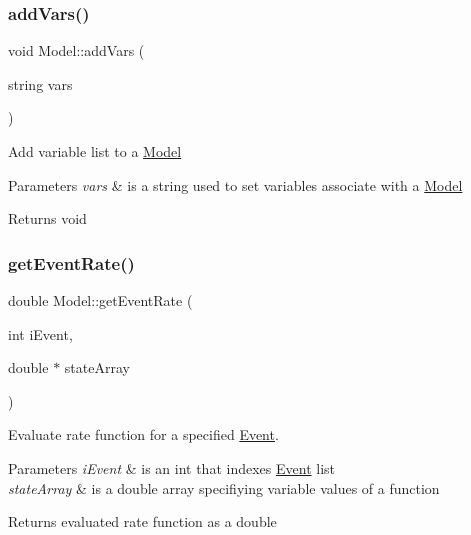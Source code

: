 \subsubsection{\texorpdfstring{add\+Vars()}{addVars()}}
{\footnotesize\ttfamily void Model\+::add\+Vars (\begin{DoxyParamCaption}\item[{string}]{vars }\end{DoxyParamCaption})}

Add variable list to a \hyperlink{class_model}{Model}


\begin{DoxyParams}{Parameters}
{\em vars} & is a string used to set variables associate with a \hyperlink{class_model}{Model} \\
\hline
\end{DoxyParams}
\begin{DoxyReturn}{Returns}
void 
\end{DoxyReturn}
\mbox{\label{class_model_a2909caddddccca90faaae708e68226ad}} 
\subsubsection{\texorpdfstring{get\+Event\+Rate()}{getEventRate()}}
{\footnotesize\ttfamily double Model\+::get\+Event\+Rate (\begin{DoxyParamCaption}\item[{int}]{i\+Event,  }\item[{double $\ast$}]{state\+Array }\end{DoxyParamCaption})}



Evaluate rate function for a specified \hyperlink{class_event}{Event}. 


\begin{DoxyParams}{Parameters}
{\em i\+Event} & is an int that indexes \hyperlink{class_event}{Event} list \\
\hline
{\em state\+Array} & is a double array specifiying variable values of a function \\
\hline
\end{DoxyParams}
\begin{DoxyReturn}{Returns}
evaluated rate function as a double 
\end{DoxyReturn}
\mbox{\label{class_model_adcb9dcc2d1d58f18d595f1476fc77b3b}} 
